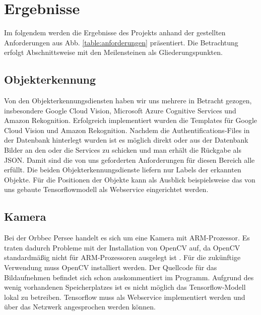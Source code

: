 \chapter{Ergebnisse\label{cha:chapter5}}
Im folgendem werden die Ergebnisse des Projekts anhand der gestellten Anforderungen aus Abb. \ref{table:anforderungen} präsentiert. Die Betrachtung erfolgt Abschnittsweise mit den Meilensteinen als Gliederungspunkten.


\section{Objekterkennung}
Von den Objekterkennungsdiensten haben wir uns mehrere in Betracht gezogen, insbesondere Google Cloud Vision, Microsoft Azure Cognitive Services und Amazon Rekognition. Erfolgreich implementiert wurden die Templates für Google Cloud Vision und Amazon Rekognition. Nachdem die Authentifications-Files in der Datenbank hinterlegt wurden ist es möglich direkt oder aus der Datenbank Bilder an den oder die Services zu schicken und man erhält die Rückgabe als JSON. Damit sind die von uns geforderten Anforderungen für diesen Bereich alle erfüllt.
Die beiden Objekterkennungsdienste liefern nur Labels der erkannten Objekte. Für die Positionen der Objekte kann als Ausblick beispielsweise das von uns gebaute Tensorflowmodell als Webservice eingerichtet werden.


\section{Kamera}
Bei der Orbbec Persee handelt es sich um eine Kamera mit ARM-Prozessor. Es traten dadurch Probleme mit der Installation von OpenCV auf, da OpenCV standardmäßig nicht für ARM-Prozessoren ausgelegt ist . Für die zukünftige Verwendung muss OpenCV installiert werden. Der Quellcode für das Bildaufnehmen befindet sich schon auskommentiert im Programm. \newline
Aufgrund des wenig vorhandenen Speicherplatzes ist es nicht möglich das Tensorflow-Modell lokal zu betreiben. Tensorflow muss als Webservice implementiert werden und über das Netzwerk angesprochen werden können.

